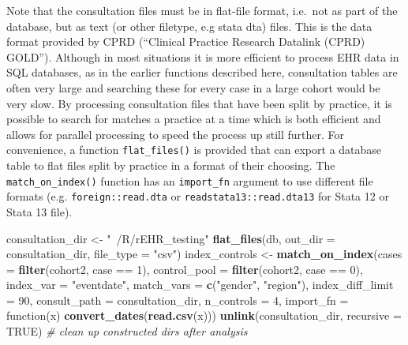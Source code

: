 \documentclass[]{article}
\newenvironment{Shaded}{\begin{snugshade}}{\end{snugshade}}
\newcommand{\KeywordTok}[1]{\textcolor[rgb]{0.13,0.29,0.53}{\textbf{{#1}}}}
\newcommand{\DataTypeTok}[1]{\textcolor[rgb]{0.13,0.29,0.53}{{#1}}}
\newcommand{\DecValTok}[1]{\textcolor[rgb]{0.00,0.00,0.81}{{#1}}}
\newcommand{\StringTok}[1]{\textcolor[rgb]{0.31,0.60,0.02}{{#1}}}
\newcommand{\CommentTok}[1]{\textcolor[rgb]{0.56,0.35,0.01}{\textit{{#1}}}}
\newcommand{\OtherTok}[1]{\textcolor[rgb]{0.56,0.35,0.01}{{#1}}}
\newcommand{\NormalTok}[1]{{#1}}
\begin{document}
Note that the consultation files must be in flat-file format, i.e.~not
as part of the database, but as text (or other filetype, e.g stata dta)
files. This is the data format provided by CPRD (``Clinical Practice
Research Datalink (CPRD) GOLD''). Although in most situations it is more
efficient to process EHR data in SQL databases, as in the earlier
functions described here, consultation tables are often very large and
searching these for every case in a large cohort would be very slow. By
processing consultation files that have been split by practice, it is
possible to search for matches a practice at a time which is both
efficient and allows for parallel processing to speed the process up
still further. For convenience, a function \texttt{flat\_files()} is
provided that can export a database table to flat files split by
practice in a format of their choosing. The \texttt{match\_on\_index()}
function has an \texttt{import\_fn} argument to use different file
formats (e.g. \texttt{foreign::read.dta} or
\texttt{readstata13::read.dta13} for Stata 12 or Stata 13 file).

\begin{Shaded}
\begin{Highlighting}[]
\NormalTok{consultation_dir <-}\StringTok{ "~/R/rEHR_testing"}
\KeywordTok{flat_files}\NormalTok{(db, }\DataTypeTok{out_dir =} \NormalTok{consultation_dir, }\DataTypeTok{file_type =} \StringTok{"csv"}\NormalTok{)}
\NormalTok{index_controls <-}\StringTok{ }\KeywordTok{match_on_index}\NormalTok{(}\DataTypeTok{cases =} \KeywordTok{filter}\NormalTok{(cohort2, case ==}\StringTok{ }\DecValTok{1}\NormalTok{), }
                                 \DataTypeTok{control_pool =} \KeywordTok{filter}\NormalTok{(cohort2, case ==}\StringTok{ }\DecValTok{0}\NormalTok{),}
                                 \DataTypeTok{index_var =} \StringTok{"eventdate"}\NormalTok{, }
                                 \DataTypeTok{match_vars =} \KeywordTok{c}\NormalTok{(}\StringTok{"gender"}\NormalTok{, }\StringTok{"region"}\NormalTok{),}
                                 \DataTypeTok{index_diff_limit =} \DecValTok{90}\NormalTok{, }
                                 \DataTypeTok{consult_path =} \NormalTok{consultation_dir,}
                                 \DataTypeTok{n_controls =} \DecValTok{4}\NormalTok{,}
                                 \DataTypeTok{import_fn =} \NormalTok{function(x) }\KeywordTok{convert_dates}\NormalTok{(}\KeywordTok{read.csv}\NormalTok{(x)))}
\KeywordTok{unlink}\NormalTok{(consultation_dir, }\DataTypeTok{recursive =} \OtherTok{TRUE}\NormalTok{) }\CommentTok{# clean up constructed dirs after analysis}
\end{Highlighting}
\end{Shaded}
\end{document}
